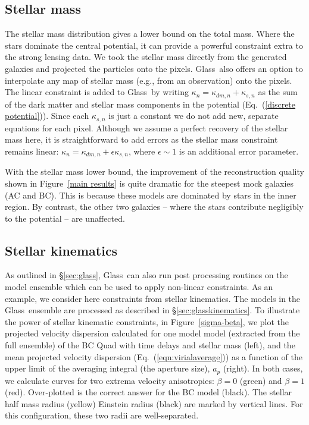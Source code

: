 \documentclass[galley,usenatbib]{mn2e}
\newcommand{\Glass}{{\sc Glass}}
\newcommand{\figref}[1] {Figure~\ref{#1}}
\newcommand{\eqnref}[1] {Eq.~(\ref{#1})}
\begin{document}
\subsection{Stellar mass}
\label{stellar mass}

The stellar mass distribution gives a lower bound on the total mass. Where the stars dominate the central potential, it can provide a powerful constraint extra to the strong lensing data. We took the stellar mass directly from
the generated galaxies and projected the particles onto the pixels. \Glass\
also offers an option to interpolate any map of stellar mass (e.g., from an
observation) onto the pixels. The linear constraint is added to \Glass\ by
writing $\kappa_n = \kappa_{dm,n} + \kappa_{s,n}$ as the sum of the
dark matter and stellar mass components in the potential (\eqnref{discrete
potential}). Since each $\kappa_{s,n}$ is just a constant we do not add new,
separate equations for each pixel. Although we assume a perfect recovery of the stellar mass here, it is straightforward to add errors as the stellar mass constraint remains linear: $\kappa_n = \kappa_{dm,n} + \epsilon \kappa_{s,n}$, where $\epsilon \sim 1$ is an additional error parameter. 

With the stellar mass lower bound, the improvement of the reconstruction
quality shown in \figref{main results} is quite dramatic for the
steepest mock galaxies (AC and BC). This is because these models are dominated
by stars in the inner region. By contrast, the other two galaxies -- where the stars contribute negligibly to the potential -- are unaffected.

\subsection{Stellar kinematics}\label{sec:results_stellar_kinematics}

As outlined in \S\ref{sec:glass}, \Glass\ can also run post processing routines
on the model ensemble which can be used to apply non-linear constraints. As an
example, we consider here constraints from stellar kinematics. The models in
the \Glass\ ensemble are processed as described in \S\ref{sec:glasskinematics}.
To illustrate the power of stellar kinematic constraints, in
\figref{sigma-beta}, we plot the projected velocity dispersion calculated for
one model model (extracted from the full ensemble) of the BC Quad with time
delays and stellar mass (left), and the mean projected velocity dispersion
(\eqnref{eqn:virialaverage}) as a function of the upper limit of the averaging
integral (the aperture size), $a_p$ (right). In both cases, we calculate curves
for two extrema velocity anisotropies: $\beta=0$ (green) and $\beta=1$ (red).
Over-plotted is the correct answer for the BC model (black). The stellar half
mass radius (yellow) Einstein radius (black) are marked by vertical lines. For
this configuration, these two radii are well-separated.
\end{document}
